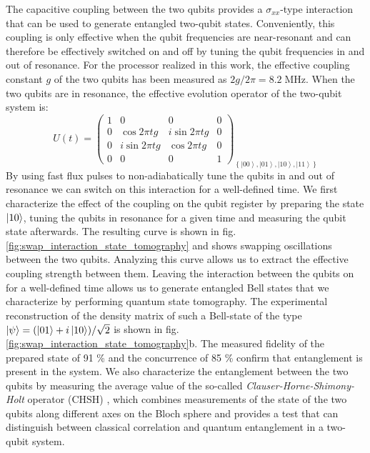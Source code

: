 The capacitive coupling between the two qubits provides a $\sigma_{xx}$-type
interaction that can be used to generate entangled two-qubit states.
Conveniently, this coupling is only effective when the qubit frequencies
are near-resonant and can therefore be effectively switched on and
off by tuning the qubit frequencies in and out of resonance. For the
processor realized in this work, the effective coupling constant $g$
of the two qubits has been measured as $2g/2\pi=8.2\;\mathrm{MHz}$.
When the two qubits are in resonance, the effective evolution operator
of the two-qubit system is:
%
\begin{equation}
U(t)=\left(\begin{array}{cccc}
1 & 0 & 0 & 0\\
0 & \cos{2\pi tg} & i\sin{2\pi tg} & 0\\
0 & i\sin{2\pi tg} & \cos{2\pi tg} & 0\\
0 & 0 & 0 & 1\end{array}\right)_{\left\{ \left|00\right\rangle ,\left|01\right\rangle ,\left|10\right\rangle ,\left|11\right\rangle \right\} } \label{eq:swap_evolution_operator}
\end{equation}
%
 By using fast flux pulses to non-adiabatically tune the qubits in
and out of resonance we can switch on this interaction for a well-defined
time. We first characterize the effect of the coupling on the qubit
register by preparing the state $\left| 10 \right>$, tuning the qubits in
resonance for a given time and measuring the qubit state afterwards.
The resulting curve is shown in fig. \ref{fig:swap_interaction_state_tomography}
and shows swapping oscillations between the two qubits. Analyzing
this curve allows us to extract the effective coupling strength between
them. Leaving the interaction between the qubits on for a well-defined
time allows us to generate entangled Bell states that we characterize
by performing quantum state tomography. The experimental reconstruction
of the density matrix of such a Bell-state of the type $\left| \psi \right>=(\left| 01 \right>+i\left| 10 \right>)/\sqrt{2}$
is shown in fig. \ref{fig:swap_interaction_state_tomography}b.
The measured fidelity of the prepared state of 91 \% and the concurrence
of 85 \% confirm that entanglement is present in the system. We also
characterize the entanglement between the two qubits by measuring the average value of the so-called \textit{Clauser-Horne-Shimony-Holt}
operator (CHSH) \citep{clauser_proposed_1969}, which
combines measurements of the state of the two qubits along different
axes on the Bloch sphere and provides a test that can distinguish
between classical correlation and quantum entanglement in a two-qubit
system.

